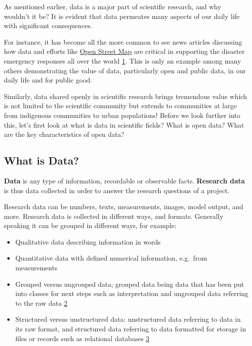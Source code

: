 \documentclass[
  letterpaper,
  DIV=11,
  numbers=noendperiod]{scrreport}
\providecommand{\tightlist}{%
  \setlength{\itemsep}{0pt}\setlength{\parskip}{0pt}}\usepackage{longtable,booktabs,array}
\begin{document}

As mentioned earlier, data is a major part of scientific research, and
why wouldn't it be? It is evident that data permeates many aspects of
our daily life with significant consequences.

For instance, it has become all the more common to see news articles
discussing how data and efforts like
\href{https://www.openstreetmap.us/}{Open Street Map} are critical in
supporting the disaster emergency responses all over the world
\href{https://www.openstreetmap.us/}{1}. This is only an example among
many others demonstrating the value of data, particularly open and
public data, in our daily life and for public good.

Similarly, data shared openly in scientific research brings tremendous
value which is not limited to the scientific community but extends to
communities at large from indigenous communities to urban populations!
Before we look further into this, let's first look at what is data in
scientific fields? What is open data? What are the key characteristics
of open data?

\hypertarget{what-is-data}{%
\subsection*{What is Data?}\label{what-is-data}}

\textbf{Data} is any type of information, recordable or observable
facts. \textbf{Research data} is thus data collected in order to answer
the research questions of a project.

Research data can be numbers, texts, measurements, images, model output,
and more. Research data is collected in different ways, and formats.
Generally speaking it can be grouped in different ways, for example:

\begin{itemize}
\tightlist
\item
  Qualitative data describing information in words
\item
  Quantitative data with defined numerical information, e.g.~from
  measurements
\item
  Grouped versus ungrouped data; grouped data being data that has been
  put into classes for next steps such as interpretation and ungrouped
  data referring to the raw data
  \href{https://keydifferences.com/difference-between-ungrouped-data-and-grouped-data.html}{2}
\item
  Structured versus unstructured data: unstructured data referring to
  data in its raw format, and structured data referring to data
  formatted for storage in files or records such as relational databases
  \href{https://www.datamation.com/big-data/structured-vs-unstructured-data/}{3}
\end{itemize}
\end{document}
